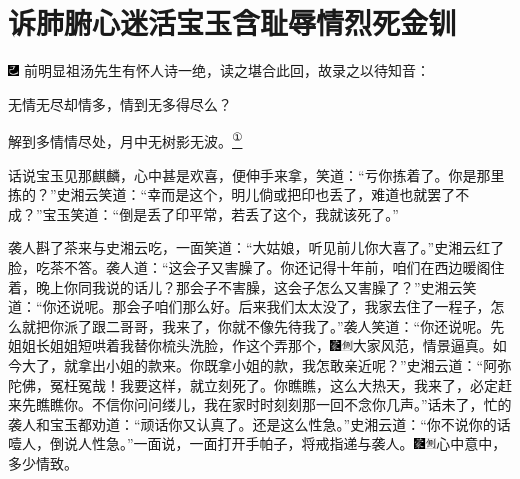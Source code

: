

\chapter{诉肺腑心迷活宝玉\hspace{.5em}含耻辱情烈死金钏}
{\includegraphics[width=3mm]{../Images/00003}  \kaishu 前明显祖汤先生有怀人诗一绝，读之堪合此回，故录之以待知音：}

{无情无尽却情多，情到无多得尽么？}

{解到多情情尽处，月中无树影无波。}\href{../Text/part0036_split_000.html\#lnkback_1_a}{\textsuperscript{①}}

话说宝玉见那麒麟，心中甚是欢喜，便伸手来拿，笑道：``亏你拣着了。你是那里拣的？''史湘云笑道：``幸而是这个，明儿倘或把印也丢了，难道也就罢了不成？''宝玉笑道：``倒是丢了印平常，若丢了这个，我就该死了。''

袭人斟了茶来与史湘云吃，一面笑道：``大姑娘，听见前儿你大喜了。''史湘云红了脸，吃茶不答。袭人道：``这会子又害臊了。你还记得十年前，咱们在西边暖阁住着，晚上你同我说的话儿？那会子不害臊，这会子怎么又害臊了？''史湘云笑道：``你还说呢。那会子咱们那么好。后来我们太太没了，我家去住了一程子，怎么就把你派了跟二哥哥，我来了，你就不像先待我了。''袭人笑道：``你还说呢。先姐姐长姐姐短哄着我替你梳头洗脸，作这个弄那个，{\includegraphics[width=3mm]{../Images/00006}\includegraphics[width=3mm]{../Images/00011}\footnotesize \kaishu 大家风范，情景逼真。}如今大了，就拿出小姐的款来。你既拿小姐的款，我怎敢亲近呢？''史湘云道：``阿弥陀佛，冤枉冤哉！我要这样，就立刻死了。你瞧瞧，这么大热天，我来了，必定赶来先瞧瞧你。不信你问问缕儿，我在家时时刻刻那一回不念你几声。''话未了，忙的袭人和宝玉都劝道：``顽话你又认真了。还是这么性急。''史湘云道：``你不说你的话噎人，倒说人性急。''一面说，一面打开手帕子，将戒指递与袭人。{\includegraphics[width=3mm]{../Images/00006}\includegraphics[width=3mm]{../Images/00011}\footnotesize \kaishu 心中意中，多少情致。}

